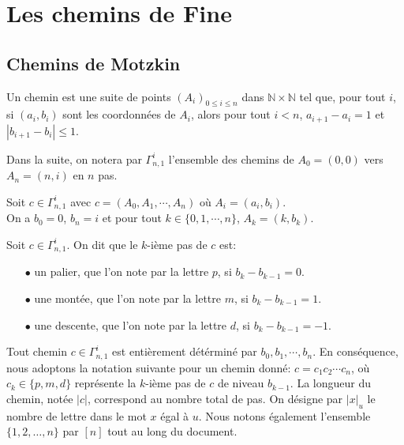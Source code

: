 \chapter{Les chemins de Fine}
\section{Chemins de Motzkin}

\begin{definition}
	\begin{rm}
		Un chemin est une suite de points $(A_{i})_{0 \leq i \leq n}$ dans $\mathbb{N}\times \mathbb{N}$ tel que, pour tout $i$, si $
			(a_{i}, b_{i})$ sont les coordonnées de $A_{i}$, alors pour tout $i<n$, $a_{i+1} - a_{i}=1$ et $|b_{i+1} - b_{i}| \leq 1$.
	\end{rm}
\end{definition}
Dans la suite, on notera par $\Gamma_{n,1}^{i}$ l'ensemble des chemins de $A_{0} = (0,0)$ vers $A_{n} = (n,i)$ en $n$ pas.

\begin{property}
	Soit $c \in \Gamma_{n,1}^{i}$ avec $c=(A_{0},A_{1}, \cdots, A_{n})$ où $A_{i}=(a_{i}, b_{i})$.\\
	On a $b_{0}=0$, $b_{n}=i$ et pour tout $k \in \{0, 1, \cdots, n\}$, $A_{k} = (k, b_{k})$.
\end{property}

\begin{definition} \label{path_char}
	\begin{rm}
		Soit $c \in \Gamma_{n,1}^{i}$. On dit que le $k$-ième pas de $c$ est:
		\begin{itemize}
			\item[$\bullet$] un palier, que l'on note par la lettre $p$, si $b_{k}- b_{k-1} = 0$.
			\item[$\bullet$] une montée, que l'on note par la lettre $m$, si $b_{k}- b_{k-1} = 1$.
			\item[$\bullet$] une descente, que l'on note par la lettre $d$, si $b_{k}- b_{k-1} = -1$.
		\end{itemize}
	\end{rm}
\end{definition}
Tout chemin $c \in \Gamma_{n,1}^{i}$ est entièrement détérminé par $b_{0}, b_{1}, \cdots, b_{n}$.
En conséquence, nous adoptons la notation suivante pour un chemin donné:
$c = c_{1}c_{2}\cdots c_{n}$, où $c_{k} \in \{p, m, d\}$ représente la $k$-ième pas de $c$ de niveau $b_{k-1}$. La longueur du chemin, notée $|c|$, correspond au nombre total de pas. On désigne par $|x|_{u}$ le nombre de lettre dans le mot $x$ égal à $u$. Nous notons également l'ensemble $\{1, 2, \ldots, n\}$ par $[n]$ tout au long du document.

